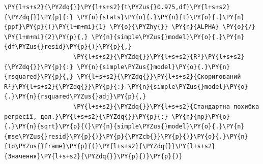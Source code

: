 \begin{Verbatim}[commandchars=\\\{\}]
                   \PY{l+s+s2}{\PYZdq{}}\PY{l+s+s2}{t\PYZus{}0.975,df}\PY{l+s+s2}{\PYZdq{}}\PY{p}{:} \PY{n}{stats}\PY{o}{.}\PY{n}{t}\PY{o}{.}\PY{n}{ppf}\PY{p}{(}\PY{l+m+mi}{1} \PY{o}{\PYZhy{}} \PY{n}{ALPHA} \PY{o}{/} \PY{l+m+mi}{2}\PY{p}{,} \PY{n}{simple\PYZus{}model}\PY{o}{.}\PY{n}{df\PYZus{}resid}\PY{p}{)}\PY{p}{,}
                   \PY{l+s+s2}{\PYZdq{}}\PY{l+s+s2}{R²}\PY{l+s+s2}{\PYZdq{}}\PY{p}{:} \PY{n}{simple\PYZus{}model}\PY{o}{.}\PY{n}{rsquared}\PY{p}{,} \PY{l+s+s2}{\PYZdq{}}\PY{l+s+s2}{Скоригований R²}\PY{l+s+s2}{\PYZdq{}}\PY{p}{:} \PY{n}{simple\PYZus{}model}\PY{o}{.}\PY{n}{rsquared\PYZus{}adj}\PY{p}{,}
                   \PY{l+s+s2}{\PYZdq{}}\PY{l+s+s2}{Стандартна похибка регресії, дол.}\PY{l+s+s2}{\PYZdq{}}\PY{p}{:} \PY{n}{np}\PY{o}{.}\PY{n}{sqrt}\PY{p}{(}\PY{n}{simple\PYZus{}model}\PY{o}{.}\PY{n}{mse\PYZus{}resid}\PY{p}{)}\PY{p}{\PYZcb{}}\PY{p}{)}\PY{o}{.}\PY{n}{to\PYZus{}frame}\PY{p}{(}\PY{l+s+s2}{\PYZdq{}}\PY{l+s+s2}{Значення}\PY{l+s+s2}{\PYZdq{}}\PY{p}{)}\PY{p}{)}
\end{Verbatim}
